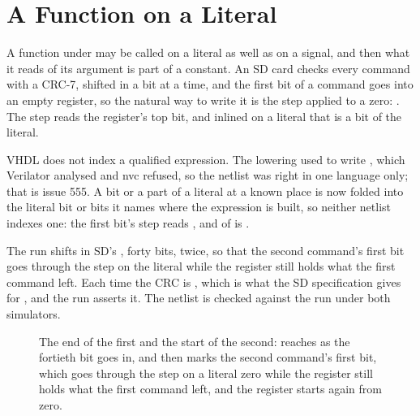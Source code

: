 \section{A Function on a Literal}
\label{sec:x-litfn}

A function under \code{\#[lower]} may be called on a literal as well
as on a signal, and then what it reads of its argument is part of a
constant. An SD card checks every command with a CRC-7, shifted in a
bit at a time, and the first bit of a command goes into an empty
register, so the natural way to write it is the step applied to a
zero: . The step reads the
register's top bit, and inlined on a literal that is a bit of the
literal.

VHDL does not index a qualified expression. The lowering used to
write , which Verilator analysed and
nvc refused, so the netlist was right in one language only; that is
issue 555. A bit or a part of a literal at a known place is now
folded into the literal bit or bits it names where the expression is
built, so neither netlist indexes one: the first bit's step reads
, and  of  is .

The run shifts in SD's , forty bits, twice, so that the
second command's first bit goes through the step on the literal while
the register still holds what the first command left. Each time the CRC
is , which is what the SD specification gives for
, and the run asserts it. The netlist is checked against
the run under both simulators.

\begin{figure}[htbp]
\centering

\caption{The end of the first  and the start of the second:
 reaches  as the fortieth bit goes in, and
 then marks the second command's first bit, which goes
through the step on a literal zero while the register still holds
what the first command left, and the register starts again from zero.}
\label{fig:x-litfn}
\end{figure}




